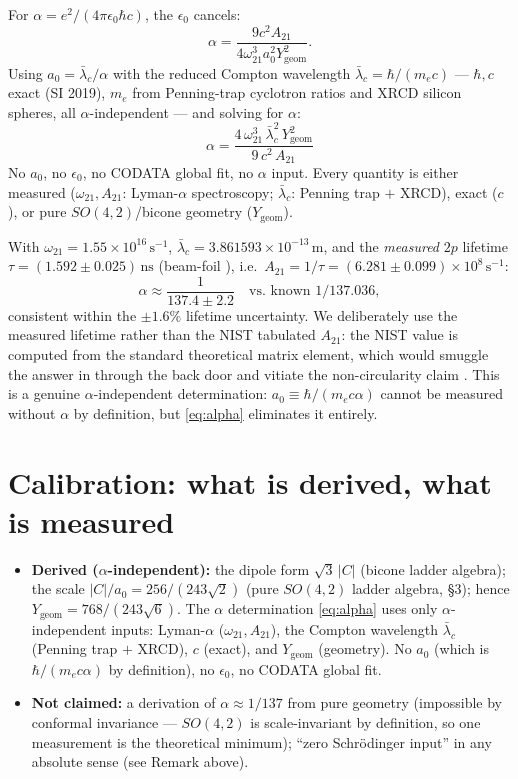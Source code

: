 \documentclass[11pt]{amsart}
\theoremstyle{remark}
\begin{document}
For $\alpha=e^2/(4\pi\epsilon_0\hbar c)$, the $\epsilon_0$ cancels:
\[
\alpha=\frac{9c^2A_{21}}{4\omega_{21}^3a_0^2Y_{\mathrm{geom}}^2}.
\]
Using $a_0=\bar\lambda_c/\alpha$ with the reduced Compton wavelength
$\bar\lambda_c=\hbar/(m_ec)$ --- $\hbar,c$ exact (SI 2019), $m_e$ from
Penning-trap cyclotron ratios and XRCD silicon spheres, all
$\alpha$-independent --- and solving for $\alpha$:
\begin{equation}\label{eq:alpha}
\boxed{
\alpha=\frac{4\,\omega_{21}^3\,\bar\lambda_c^2\,Y_{\mathrm{geom}}^2}
{9\,c^2\,A_{21}}
}
\end{equation}
No $a_0$, no $\epsilon_0$, no CODATA global fit, no $\alpha$ input.
Every quantity is either measured ($\omega_{21},A_{21}$: Lyman-$\alpha$
spectroscopy; $\bar\lambda_c$: Penning trap $+$ XRCD), exact ($c$),
or pure $SO(4,2)$/bicone geometry ($Y_{\mathrm{geom}}$).

With $\omega_{21}=1.55\times10^{16}\,\mathrm{s}^{-1}$,
$\bar\lambda_c=3.861593\times10^{-13}\,\mathrm{m}$, and the
\emph{measured} $2p$ lifetime
$\tau=(1.592\pm0.025)\,\mathrm{ns}$ (beam-foil \cite{Tielert}), i.e.\
$A_{21}=1/\tau=(6.281\pm0.099)\times10^8\,\mathrm{s}^{-1}$:
\[
\alpha\approx\frac1{137.4\pm2.2}\quad\text{vs.\ known }1/137.036,
\]
consistent within the $\pm1.6\%$ lifetime uncertainty.  We deliberately
use the measured lifetime rather than the NIST tabulated $A_{21}$:
the NIST value is computed from the standard theoretical matrix
element, which would smuggle the answer in through the back door and
vitiate the non-circularity claim \cite{Trabert}.  This is a genuine
$\alpha$-independent determination: $a_0\equiv\hbar/(m_ec\alpha)$
cannot be measured without $\alpha$ by definition, but
\eqref{eq:alpha} eliminates it entirely.

\section{Calibration: what is derived, what is measured}

\begin{itemize}
\item \textbf{Derived ($\alpha$-independent):} the dipole form
$\sqrt3\,|C|$ (bicone ladder algebra); the scale
$|C|/a_0=256/(243\sqrt2)$ (pure $SO(4,2)$ ladder algebra, \S3);
hence $Y_{\mathrm{geom}}=768/(243\sqrt6)$.  The $\alpha$
determination \eqref{eq:alpha} uses only $\alpha$-independent inputs:
Lyman-$\alpha$ ($\omega_{21},A_{21}$), the Compton wavelength
$\bar\lambda_c$ (Penning trap $+$ XRCD), $c$ (exact), and
$Y_{\mathrm{geom}}$ (geometry).  No $a_0$ (which is
$\hbar/(m_ec\alpha)$ by definition), no $\epsilon_0$, no CODATA
global fit.
\item \textbf{Not claimed:} a derivation of $\alpha\approx1/137$ from
pure geometry (impossible by conformal invariance --- $SO(4,2)$ is
scale-invariant by definition, so one measurement is the theoretical
minimum); ``zero Schr\"odinger input'' in any absolute sense (see
Remark above).
\end{itemize}
\end{document}
